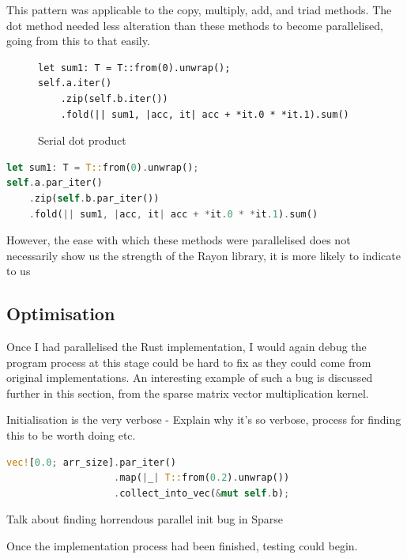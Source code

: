 This pattern was applicable to the copy, multiply, add, and triad methods. The dot method needed less alteration than these methods to become parallelised, going from this to that easily.
\begin{figure}[ht]
\begin{verbatim}
let sum1: T = T::from(0).unwrap();
self.a.iter()
    .zip(self.b.iter())
    .fold(|| sum1, |acc, it| acc + *it.0 * *it.1).sum()
\end{verbatim}
\caption{Serial dot product}
\end{figure}
\begin{lstlisting}[language=Rust]
let sum1: T = T::from(0).unwrap();
self.a.par_iter()
    .zip(self.b.par_iter())
    .fold(|| sum1, |acc, it| acc + *it.0 * *it.1).sum()
\end{lstlisting}
However, the ease with which these methods were parallelised does not necessarily show us the strength of the Rayon library, it is more likely to indicate to us

\subsection{Optimisation}
Once I had parallelised the Rust implementation, I would again debug the program process at this stage could be hard to fix as they could come from original implementations. An interesting example of such a bug is discussed further in this section, from the sparse matrix vector multiplication kernel.

Initialisation is the very verbose - Explain why it's so verbose, process for finding this to be worth doing etc.
\begin{lstlisting}[language=Rust]
vec![0.0; arr_size].par_iter()
                   .map(|_| T::from(0.2).unwrap())
                   .collect_into_vec(&mut self.b);
\end{lstlisting}

Talk about finding horrendous parallel init bug in Sparse

Once the implementation process had been finished, testing could begin.


